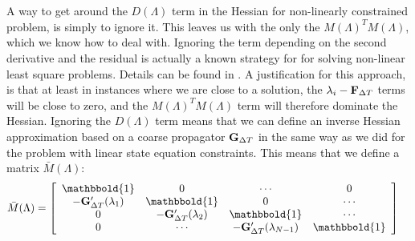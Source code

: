\\
\\
A way to get around the $D(\Lambda)$ term in the Hessian for non-linearly constrained problem, is simply to ignore it. This leaves us with the only the $M(\Lambda)^TM(\Lambda)$, which we know how to deal with. Ignoring the term depending on the second derivative and the residual is actually a known strategy for for solving non-linear least square problems. Details can be found in \cite{nocedal2006numerical}. A justification for this approach, is that at least in instances where we are close to a solution, the $\lambda_i-\bold F_{\Delta T}$ terms will be close to zero, and the $M(\Lambda)^TM(\Lambda)$ term will therefore dominate the Hessian. Ignoring the $D(\Lambda)$ term means that we can define an inverse Hessian approximation based on a coarse propagator $\bold G_{\Delta T}$ in the same way as we did for the problem with linear state equation constraints. This means that we define a matrix $\bar M(\Lambda)$:
\begin{align*}
\bar M(\Lambda) &= \left[ \begin{array}{cccc}
   \mathbbold{1} & 0 & \cdots & 0 \\  
   -\bold{G}_{\Delta T}'(\lambda_{1}) & \mathbbold{1} & 0 & \cdots \\ 
   0 &-\bold{G}_{\Delta T}'(\lambda_{2}) & \mathbbold{1}  & \cdots \\
   0 &\cdots &-\bold{G}_{\Delta T}'(\lambda_{N-1}) & \mathbbold{1}  \\
   \end{array}  \right]
\end{align*}
